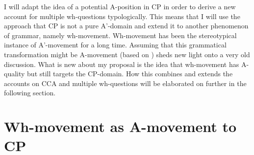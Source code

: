 \documentclass[output=paper,colorlinks,citecolor=brown]{langscibook}
\begin{document}
\noindent I will adapt the idea of a potential A-position in CP in order to derive a new account for multiple wh-questions typologically. This means that I will use the approach that CP is not a pure A'-domain and extend it to another phenomenon of grammar, namely wh-movement. Wh-movement has been the stereotypical instance of A'-movement for a long time. Assuming that this grammatical transformation might be A-movement (based on \citealp{richards1997}) sheds new light onto a very old discussion. What is new about my proposal is the idea that wh-movement has A-quality but still targets the CP-domain. How this combines and extends the accounts on CCA and multiple wh-questions will be elaborated on further in the following section.

\section{Wh-movement as A-movement to CP}
\end{document}

